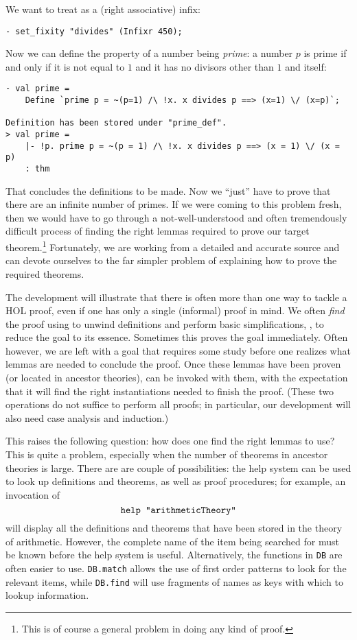 We want to treat  as a (right associative) infix:
\begin{session}\begin{verbatim}
- set_fixity "divides" (Infixr 450);
\end{verbatim}\end{session}
Now we can define the property of a number being \emph{prime}: a number $p$ is
prime if and only if it is not equal to $1$ and it has no divisors other
than $1$ and itself:

\begin{session}\begin{verbatim}
- val prime =
    Define `prime p = ~(p=1) /\ !x. x divides p ==> (x=1) \/ (x=p)`;

Definition has been stored under "prime_def".
> val prime =
    |- !p. prime p = ~(p = 1) /\ !x. x divides p ==> (x = 1) \/ (x = p)
    : thm
\end{verbatim}\end{session}

That concludes the definitions to be made. Now we ``just'' have to prove
that there are an infinite number of primes. If we were coming to this
problem fresh, then we would have to go through a not-well-understood
and often tremendously difficult process of finding the right lemmas
required to prove our target theorem.\footnote{This is of course a
general problem in doing any kind of proof.} Fortunately, we are working
from a detailed and accurate source and can devote ourselves to the far
simpler problem of explaining how to prove the required theorems.

The development will illustrate that there is often more than one way to
tackle a HOL proof, even if one has only a single (informal) proof in
mind. We often \emph{find} the proof using  to unwind
definitions and perform basic simplifications, \ie, to reduce the goal
to its essence. Sometimes this proves the goal immediately. Often
however, we are left with a goal that requires some study before one
realizes what lemmas are needed to conclude the proof. Once these lemmas
have been proven (or located in ancestor theories),  can
be invoked with them, with the expectation that it will find the right
instantiations needed to finish the proof. (These two operations do not
suffice to perform all proofs; in particular, our development will also need
case analysis and induction.)

This raises the following question: how does one find the right lemmas
to use? This is quite a problem, especially when the number of
theorems in ancestor theories is large. There are are couple of
possibilities: the help system can be used to look up definitions and
theorems, as well as proof procedures; for example, an invocation of
\[
\mbox{\texttt{help "arithmeticTheory"}}
\]
will display all the definitions and theorems that have been stored in
the theory of arithmetic. However, the complete name of the item being
searched for must be known before the help system is useful.
Alternatively, the functions in \verb+DB+ are often easier to use.
\verb+DB.match+ allows the use of first order patterns to look for the
relevant items, while \verb+DB.find+ will use fragments of names as
keys with which to lookup information.

